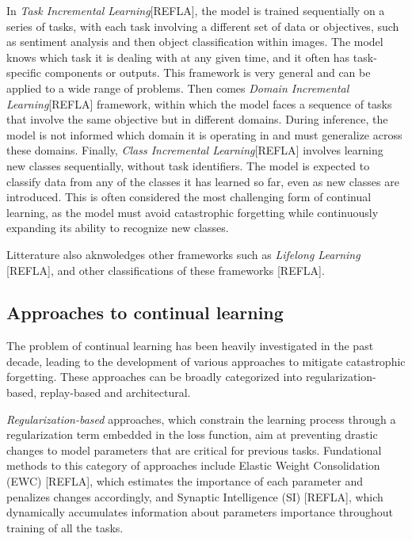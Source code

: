 \documentclass[11pt]{article}
\begin{document}
\vspace{2mm}
\noindent
In \textit{Task Incremental Learning}[REFLA], the model is trained sequentially on a series of tasks, with each task involving a different set of data or objectives, such as sentiment analysis and then object classification within images. The model knows which task it is dealing with at any given time, and it often has task-specific components or outputs. This framework is very general and can be applied to a wide range of problems. Then comes \textit{Domain Incremental Learning}[REFLA] framework, within which the model faces a sequence of tasks that involve the same objective but in different domains. During inference, the model is not informed which domain it is operating in and must generalize across these domains. Finally, \textit{Class Incremental Learning}[REFLA] involves learning new classes sequentially, without task identifiers. The model is expected to classify data from any of the classes it has learned so far, even as new classes are introduced. This is often considered the most challenging form of continual learning, as the model must avoid catastrophic forgetting while continuously expanding its ability to recognize new classes.

\vspace{2mm}
\noindent
Litterature also aknwoledges other frameworks such as \textit{Lifelong Learning} [REFLA], and other classifications of these frameworks [REFLA].


\subsection{Approaches to continual learning}


The problem of continual learning has been heavily investigated in the past decade, leading to the development of various approaches to mitigate catastrophic forgetting. These approaches can be broadly categorized into regularization-based, replay-based and architectural.

\vspace{2mm}
\noindent
\textit{Regularization-based} approaches, which constrain the learning process through a regularization term embedded in the loss function, aim at preventing drastic changes to model parameters that are critical for previous tasks. Fundational methods to this category of approaches include Elastic Weight Consolidation (EWC) [REFLA], which estimates the importance of each parameter and penalizes changes accordingly, and Synaptic Intelligence (SI) [REFLA], which dynamically accumulates information about parameters importance throughout training of all the tasks.
\end{document}
